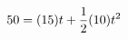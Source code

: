 \documentclass[preview]{standalone}
\begin{document}
\begin{align*}
\special{dvisvgm:raw <g id='unique000'>}50 = (15)t + \frac{1}{2}(10)t^2\special{dvisvgm:raw </g>}
\end{align*}
\end{document}
